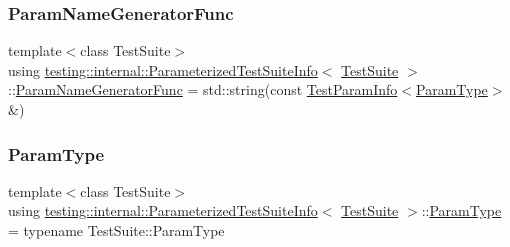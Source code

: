 \mbox{\label{classtesting_1_1internal_1_1ParameterizedTestSuiteInfo_a3b4f232b7d6d3df941bb8e81b6b534a4}} 
\subsubsection{\texorpdfstring{Param\+Name\+Generator\+Func}{ParamNameGeneratorFunc}}
{\footnotesize\ttfamily template$<$class Test\+Suite$>$ \\
using \hyperlink{classtesting_1_1internal_1_1ParameterizedTestSuiteInfo}{testing\+::internal\+::\+Parameterized\+Test\+Suite\+Info}$<$ \hyperlink{classtesting_1_1TestSuite}{Test\+Suite} $>$\+::\hyperlink{classtesting_1_1internal_1_1ParameterizedTestSuiteInfo_a3b4f232b7d6d3df941bb8e81b6b534a4}{Param\+Name\+Generator\+Func} =  std\+::string(const \hyperlink{structtesting_1_1TestParamInfo}{Test\+Param\+Info}$<$\hyperlink{classtesting_1_1internal_1_1ParameterizedTestSuiteInfo_a10761bd750a6820a8d8d2c654b10fe54}{Param\+Type}$>$\&)}

\mbox{\label{classtesting_1_1internal_1_1ParameterizedTestSuiteInfo_a10761bd750a6820a8d8d2c654b10fe54}} 
\subsubsection{\texorpdfstring{Param\+Type}{ParamType}}
{\footnotesize\ttfamily template$<$class Test\+Suite$>$ \\
using \hyperlink{classtesting_1_1internal_1_1ParameterizedTestSuiteInfo}{testing\+::internal\+::\+Parameterized\+Test\+Suite\+Info}$<$ \hyperlink{classtesting_1_1TestSuite}{Test\+Suite} $>$\+::\hyperlink{classtesting_1_1internal_1_1ParameterizedTestSuiteInfo_a10761bd750a6820a8d8d2c654b10fe54}{Param\+Type} =  typename Test\+Suite\+::\+Param\+Type}

